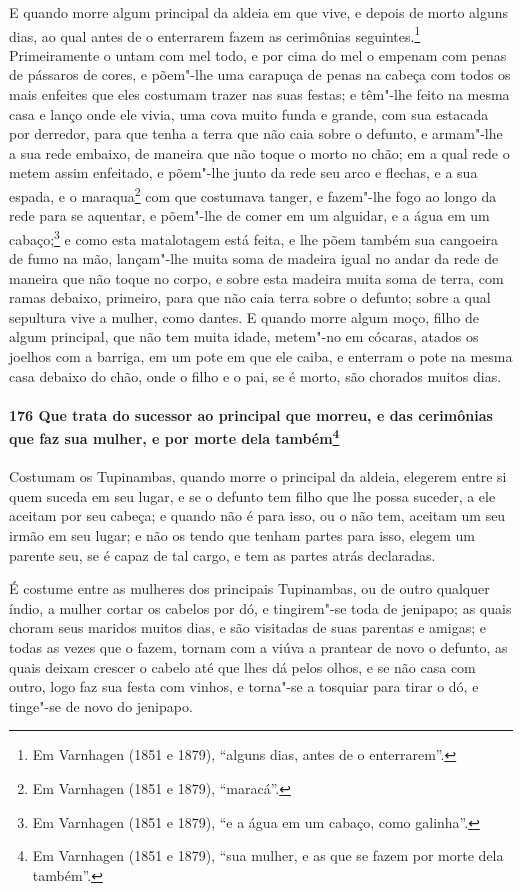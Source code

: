 \begin{linenumbers}
E quando morre algum principal da aldeia em que vive, e depois de morto alguns dias, ao
qual antes de o enterrarem fazem as cerimônias seguintes.\footnote{ Em Varnhagen (1851 e
1879), ``alguns dias, antes de o enterrarem''.} Primeiramente o untam com mel todo, e por
cima do mel o empenam com penas de pássaros de cores, e põem"-lhe uma carapuça de penas na
cabeça com todos os mais enfeites que eles costumam trazer nas suas festas; e têm"-lhe
feito na mesma casa e lanço onde ele vivia, uma cova muito funda e grande, com sua
estacada por derredor, para que tenha a terra que não caia sobre o defunto, e armam"-lhe a
sua rede embaixo, de maneira que não toque o morto no chão; em a qual rede o metem assim
enfeitado, e põem"-lhe junto da rede seu arco e flechas, e a sua espada, e o
maraqua\footnote{ Em Varnhagen (1851 e 1879), ``maracá''.} com que costumava tanger, e
fazem"-lhe fogo ao longo da rede para se aquentar, e põem"-lhe de comer em um alguidar, e a
água em um cabaço;\footnote{ Em Varnhagen (1851 e 1879), ``e a água em um cabaço, como
galinha''.} e como esta matalotagem está feita, e lhe põem também sua cangoeira de fumo na
mão, lançam"-lhe muita soma de madeira igual no andar da rede de maneira que não toque no
corpo, e sobre esta madeira muita soma de terra, com ramas debaixo, primeiro, para que não
caia terra sobre o defunto; sobre a qual sepultura vive a mulher, como dantes. E quando
morre algum moço, filho de algum principal, que não tem muita idade, metem"-no em cócaras,
atados os joelhos com a barriga, em um pote em que ele caiba, e enterram o pote na mesma
casa debaixo do chão, onde o filho e o pai, se é morto, são chorados muitos dias.

\paragraph{176 Que trata do sucessor ao principal que morreu, e das cerimônias que faz sua
mulher, e por morte dela também\protect\footnote{ Em Varnhagen (1851 e 1879), ``sua
mulher, e as que se fazem por morte dela também''.}}\quad
Costumam os Tupinambas, quando morre o principal da aldeia, elegerem entre si quem suceda
em seu lugar, e se o defunto tem filho que lhe possa suceder, a ele aceitam por seu
cabeça; e quando não é para isso, ou o não tem, aceitam um seu irmão em seu lugar; e não
os tendo que tenham partes para isso, elegem um parente seu, se é capaz de tal cargo, e
tem as partes atrás declaradas.

É costume entre as mulheres dos principais Tupinambas, ou de outro qualquer índio, a
mulher cortar os cabelos por dó, e tingirem"-se toda de jenipapo; as quais choram seus
maridos muitos dias, e são visitadas de suas parentas e amigas; e todas as vezes que o
fazem, tornam com a viúva a prantear de novo o defunto, as quais deixam crescer o cabelo
até que lhes dá pelos olhos, e se não casa com outro, logo faz sua festa com vinhos, e
torna"-se a tosquiar para tirar o dó, e tinge"-se de novo do jenipapo.


\end{linenumbers}
